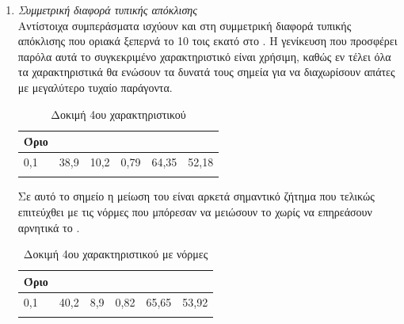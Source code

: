 \begin{enumerate}
\item{\textit{Συμμετρική διαφορά τυπικής απόκλισης}} \\
Αντίστοιχα συμπεράσματα ισχύουν και στη συμμετρική διαφορά τυπικής απόκλισης που οριακά ξεπερνά το 10 τοις εκατό στο . Η γενίκευση που προσφέρει παρόλα αυτά το συγκεκριμένο χαρακτηριστικό είναι χρήσιμη, καθώς εν τέλει όλα τα χαρακτηριστικά θα ενώσουν τα δυνατά τους σημεία για να διαχωρίσουν απάτες με μεγαλύτερο τυχαίο παράγοντα.
\begin{center}
\begin{longtabu} to 0.8\textwidth { | X[c] || X[c] | X[c] | X[c] | X[c] | X[c] |  }
 \hline
  Όριο &   &  &  &  & \\
 ,1&	38,9&	10,2&	0,79&	64,35&	52,18 \\
\hline
\caption{Δοκιμή 4ου χαρακτηριστικού}
\label{testfeat4}
\end{longtabu}
\end{center}
Σε αυτό το σημείο η μείωση του  είναι αρκετά σημαντικό ζήτημα που τελικώς επιτεύχθει με τις νόρμες που μπόρεσαν να μειώσουν το  χωρίς να επηρεάσουν αρνητικά το . 
\begin{center}
\begin{longtabu} to 0.8\textwidth { | X[c] || X[c] | X[c] | X[c] | X[c] | X[c] |  }
 \hline
  Όριο &   &  &  &  & \\
 ,1&	40,2&	8,9&	0,82&	65,65&	53,92\\
\hline
\caption{Δοκιμή 4ου χαρακτηριστικού με νόρμες}
\label{testfeat4norms}
\end{longtabu}
\end{center}


\end{enumerate}
